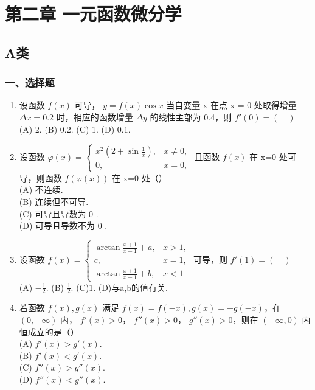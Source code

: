 \documentclass[12pt, a4paper]{ctexart}
\begin{document}
\section{第二章 一元函数微分学}

\subsection{A类}

\subsubsection*{一、选择题}

\begin{enumerate}
    \item 设函数 $ f(x) $ 可导， $ y = f(x) \cos x $ 当自变量 x 在点 x = 0 处取得增量 $ \Delta x = 0.2 $ 时，相应的函数增量 $ \Delta y $ 的线性主部为 0.4，则 $ f'(0) = (\quad) $\\
    (A) 2. \quad (B) 0.2. \quad (C) 1. \quad (D) 0.1.

    \item 设函数 $ \varphi(x)=\begin{cases}x^{2}\left(2+\sin\frac{1}{x}\right),&x\neq0,\\0,&x=0,\end{cases} $ 且函数 $ f(x) $ 在 x=0 处可导，则函数 $ f(\varphi(x)) $ 在 x=0 处（）\\
    (A) 不连续.\\
    (B) 连续但不可导.\\
    (C) 可导且导数为 0 .\\
    (D) 可导且导数不为 0 .

    \item 设函数 $ f(x) = \begin{cases} \arctan \frac{x+1}{x-1} + a, & x > 1, \\ c, & x = 1, \\ \arctan \frac{x+1}{x-1} + b, & x < 1 \end{cases} $ 可导，则 $ f'(1) = (\quad) $\\
    (A) $ -\frac{1}{2} $. (B) $ \frac{1}{2} $. (C)1. (D)与a,b的值有关.

    \item 若函数 $ f(x), g(x) $ 满足 $ f(x) = f(-x), g(x) = -g(-x) $，在 $ (0, +\infty) $ 内， $ f'(x) > 0 $， $ f''(x) > 0 $， $ g''(x) > 0 $，则在 $ (-\infty, 0) $ 内恒成立的是（）\\
    (A) $ f'(x) > g'(x) $.\\
    (B) $ f'(x) < g'(x) $.\\
    (C) $ f''(x) > g''(x) $.\\
    (D) $ f''(x) < g''(x) $.


\end{enumerate}
\end{document}
